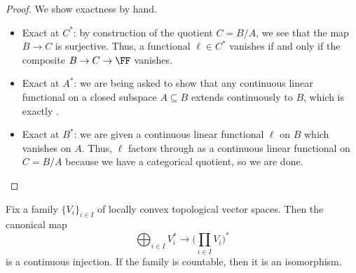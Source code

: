 \documentclass[notes.tex]{subfiles}
\begin{document}
\begin{proof}
	We show exactness by hand.
	\begin{itemize}
		\item Exact at $C^*$: by construction of the quotient $C=B/A$, we see that the map $B\to C$ is surjective. Thus, a functional $\ell\in C^*$ vanishes if and only if the composite $B\to C\to\FF$ vanishes.
		\item Exact at $A^*$: we are being asked to show that any continuous linear functional on a closed subspace $A\subseteq B$ extends continuously to $B$, which is exactly .
		\item Exact at $B^*$: we are given a continuous linear functional $\ell$ on $B$ which vanishes on $A$. Thus, $\ell$ factors through as a continuous linear functional on $C=B/A$ because we have a categorical quotient, so we are done.
		\qedhere
	\end{itemize}
\end{proof}
\begin{lemma} \label{lem:dual-coprod-to-prod}
	Fix a family $\{V_i\}_{i\in I}$ of locally convex topological vector spaces. Then the canonical map
	\[\bigoplus_{i\in I}V_i^*\to\Bigg(\prod_{i\in I}V_i\Bigg)^*\]
	is a continuous injection. If the family is countable, then it is an isomorphism.
\end{lemma}
\end{document}
